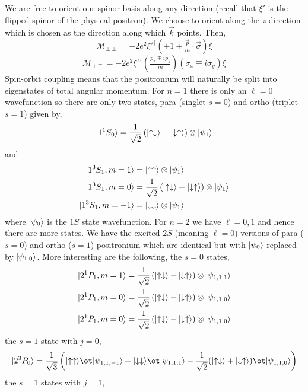 \documentclass[12pt]{article}
\newcommand{\cM}{\mathcal{M}}
\DeclarePairedDelimiter\ket{\lvert}{\rangle}
\begin{document}
We are free to orient our spinor basis along any direction  (recall that $\xi'$ is the flipped spinor of the physical positron). We choose to orient along the $z$-direction which is chosen as the direction along which $\vec{k}$ points. Then,
\[ \cM_{\pm \pm} = - 2 e^2 \xi'^{\dagger} (\pm 1 + \tfrac{\vec{p}}{m} \cdot \vec{\sigma}) \xi \]
\[ \cM_{\pm \mp} = - 2 e^2 \xi'^{\dagger} (\tfrac{p_x \mp i p_y}{m}) (\sigma_x \mp i \sigma_y) \xi \]
Spin-orbit coupling means that the positronium will naturally be split into eigenstates of total angular momentum. For $n = 1$ there is only an $\ell = 0$ wavefunction so there are only two states, para (singlet $s = 0$) and ortho (triplet $s = 1$) given by,
\[ \ket{{1}^1 S_0} = \frac{1}{\sqrt{2}} \left( \ket{\uparrow \downarrow} - \ket{\downarrow \uparrow} \right) \otimes \ket{\psi_1} \]
and
\begin{align*}
\ket{{1}^3 S_1, m = 1} &= \ket{\uparrow \uparrow} \otimes \ket{\psi_1}
\\
\ket{{1}^3 S_1, m = 0} &= \frac{1}{\sqrt{2}} \left( \ket{\uparrow \downarrow} + \ket{ \downarrow \uparrow} \right) \otimes \ket{\psi_1}
\\
\ket{{1}^3 S_1, m = -1} &= \ket{\downarrow \downarrow} \otimes \ket{\psi_1}
\end{align*}
where $\ket{\psi_0}$ is the $1S$ state wavefunction. For $n = 2$ we have $\ell = 0,1$ and hence there are more states. We have the excited $2S$ (meaning $\ell = 0$) versions of para ($s = 0$) and ortho ($s = 1$) positronium which are identical but with $\ket{\psi_0}$ replaced by $\ket{\psi_{1,0}}$. More interesting are the following,
the $s = 0$ states,
\begin{align*}
\ket{{2}^1 P_1, m = 1} &= \frac{1}{\sqrt{2}} \left( \ket{\uparrow \downarrow} - \ket{\downarrow \uparrow} \right) \otimes \ket{\psi_{1,1,1}}
\\
\ket{{2}^1 P_1, m = 0} &= \frac{1}{\sqrt{2}} \left( \ket{\uparrow \downarrow} - \ket{\downarrow \uparrow} \right) \otimes \ket{\psi_{1,1,0}}
\\
\ket{{2}^1 P_1, m = 0} &= \frac{1}{\sqrt{2}} \left( \ket{\uparrow \downarrow} - \ket{\downarrow \uparrow} \right) \otimes \ket{\psi_{1,1,0}}
\end{align*}
the $s = 1$ state with $j = 0$,
\[ \ket{2^{3} P_0} = \frac{1}{\sqrt{3}} \left( \ket{\uparrow \uparrow} \ot \ket{\psi_{1,1,-1}} + \ket{\downarrow \downarrow} \ot \ket{\psi_{1,1,1}}  - \frac{1}{\sqrt{2}} (\ket{\uparrow \downarrow} + \ket{\downarrow \uparrow}) \ot \ket{\psi_{1,1,0}} \right) \]
the $s = 1$ states with $j = 1$,
\end{document}
